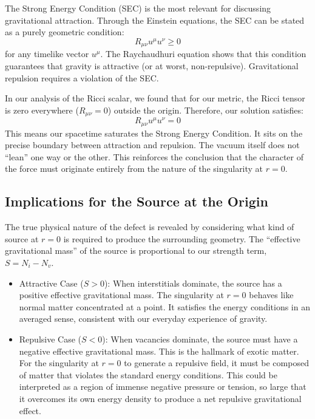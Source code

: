 \documentclass[%
  reprint,
  superscriptaddress,
  showpacs,
  showkeys,
  amsmath,amssymb,
  pra,
  longbibliography,
  floatfix,
  x11names
]{revtex4-2}
\begin{document}
The Strong Energy Condition (SEC) is the most relevant for discussing gravitational attraction. Through the Einstein equations, the SEC can be stated as a purely geometric condition:
\begin{equation}
    R_{\mu\nu}u^\mu u^\nu \ge 0
\end{equation}
for any timelike vector $u^\mu$. The Raychaudhuri equation shows that this condition guarantees that gravity is attractive (or at worst, non-repulsive). Gravitational repulsion requires a violation of the SEC.

In our analysis of the Ricci scalar, we found that for our metric, the Ricci tensor is zero everywhere ($R_{\mu\nu}=0$) outside the origin. Therefore, our solution satisfies:
\begin{equation}
    R_{\mu\nu}u^\mu u^\nu = 0
\end{equation}
This means our spacetime {saturates the Strong Energy Condition}. It sits on the precise boundary between attraction and repulsion. The vacuum itself does not ``lean'' one way or the other. This reinforces the conclusion that the character of the force must originate entirely from the nature of the singularity at $r=0$.

\subsection{Implications for the Source at the Origin}

The true physical nature of the defect is revealed by considering what kind of source at $r=0$ is required to produce the surrounding geometry. The ``effective gravitational mass'' of the source is proportional to our strength term, $S = N_i - N_v$.

\begin{itemize}
    \item {Attractive Case ($S > 0$):}
    When interstitials dominate, the source has a positive effective gravitational mass. The singularity at $r=0$ behaves like normal matter concentrated at a point. It satisfies the energy conditions in an averaged sense, consistent with our everyday experience of gravity.

    \item {Repulsive Case ($S < 0$):}
    When vacancies dominate, the source must have a negative effective gravitational mass. This is the hallmark of  exotic matter. For the singularity at $r=0$ to generate a repulsive field, it must be composed of matter that violates the standard energy conditions. This could be interpreted as a region of immense negative pressure or tension, so large that it overcomes its own energy density to produce a net repulsive gravitational effect.
\end{itemize}
\end{document}
